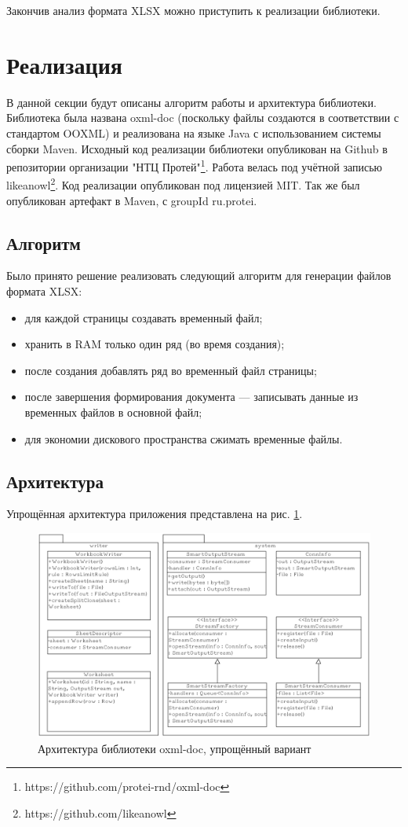 \documentclass[14pt]{matmex-diploma-custom}
\begin{document}
Закончив анализ формата XLSX можно приступить к реализации библиотеки.
\section{Реализация}
В данной секции будут описаны алгоритм работы и архитектура библиотеки. Библиотека была названа oxml-doc (поскольку файлы создаются в соответствии с стандартом OOXML) и реализована на языке Java с использованием системы сборки Maven. Исходный код реализации библиотеки опубликован на Github в репозитории организации "НТЦ Протей"\footnote{https://github.com/protei-rnd/oxml-doc}. Работа велась под учётной записью likeanowl\footnote{https://github.com/likeanowl}. Код реализации опубликован под лицензией MIT. Так же был опубликован артефакт в Maven, с groupId ru.protei.
\subsection{Алгоритм}
Было принято решение реализовать следующий алгоритм для генерации файлов формата XLSX:
\begin{itemize}
    \item для каждой страницы создавать временный файл;
    \item хранить в RAM только один ряд (во время создания);
    \item после создания добавлять ряд во временный файл страницы;
    \item после завершения формирования документа --- записывать данные из временных файлов в основной файл;
    \item для экономии дискового пространства сжимать временные файлы.
\end{itemize}

\subsection{Архитектура}
Упрощённая архитектура приложения представлена на рис. \ref{arch_lib}.

    \begin{figure}
        \centering
        \includegraphics[width=\textwidth]{pics/archsimple.png}
        \caption{Архитектура библиотеки oxml-doc, упрощённый вариант\label{arch_lib}}
    \end{figure}
\end{document}
